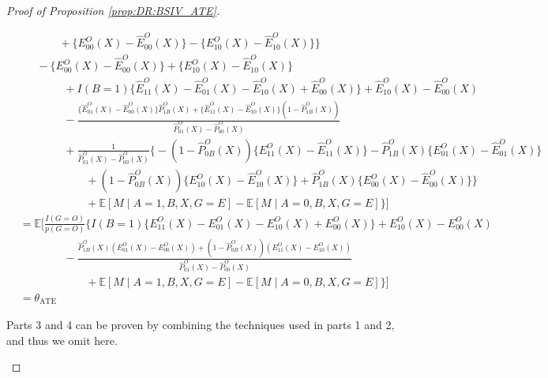 \documentclass[10pt]{article}
\newcommand{\E}{\mathbb{E}}
\begin{document}
\begin{proof}[Proof of Proposition \ref{prop:DR:BSIV_ATE}]
\begin{itemize}
{\begin{align*}
    &\ \ \ \ \ \ \ \ \ \ \ \ \ \ \ \ +\{E_{00}^O(X)-\hat{E}_{00}^O(X)\}-\{E_{10}^O(X)-\hat{E}_{10}^O(X)\}\Big\}\\
    &\ \ \ \ \ \ \ -\{E_{00}^O(X)-\hat{E}_{00}^O(X)\}+\{E_{10}^O(X)-\hat{E}_{10}^O(X)\}\\
    &\ \ \ \ \ \ \ \ \ \ \ \ \ \ \ \ \ \ +I(B=1)\{\hat{E}_{11}^O(X)-\hat{E}_{01}^O(X)-\hat{E}_{10}^O(X)+\hat{E}_{00}^O(X)\}+\hat{E}_{10}^O(X)-\hat{E}_{00}^O(X)\\
    &\ \ \ \ \ \ \ \ \ \ \ \ \ \ \ \ \ \ -\frac{\{\hat{E}_{01}^O(X)-\hat{E}_{00}^O(X)\}\hat{P}_{1B}^O(X)+\{\hat{E}_{11}^O(X)-\hat{E}_{10}^O(X)\}(1-\hat{P}_{1B}^O(X))}{\hat{P}_{01}^O(X)-\hat{P}_{00}^O(X)}\\
    &\ \ \ \ \ \ \ \ \ \ \ \ \ \ \ \ \ \ +\frac{1}{\hat{P}_{01}^O(X)-\hat{P}_{00}^O(X)}\bigg\{-(1-\hat{P}_{0B}^O(X))\{E_{11}^O(X)-\hat{E}_{11}^O(X)\}-\hat{P}_{1B}^O(X)\{E_{01}^O(X)-\hat{E}_{01}^O(X)\}\\
    &~~~~~~~~~~~~~~~~~~~~~~~~~~~+(1-\hat{P}_{0B}^O(X))\{E_{10}^O(X)-\hat{E}_{10}^O(X)\}+\hat{P}_{1B}^O(X)\{E_{00}^O(X)-\hat{E}_{00}^O(X)\}\bigg\}\\
    &~~~~~~~~~~~~~~~~~~~~~~~~~~~+\E[M\mid A=1,B,X,G=E]-\E[M\mid A=0,B,X,G=E]\Bigg\}\Big]\\
    &=\E\Big[\frac{I(G=O)}{p(G=O)}\Bigg\{I(B=1)\{E_{11}^O(X)-E_{01}^O(X)-E_{10}^O(X)+E_{00}^O(X)\}+E_{10}^O(X)-E_{00}^O(X)\\
    &\ \ \ \ \ \ \ \ \ \ \ \ \ \ \ \ \ \ -\frac{\hat{P}_{1B}^O(X)(E_{01}^O(X)-E_{00}^O(X))+(1-\hat{P}_{0B}^O(X))(E_{11}^O(X)-E_{10}^O(X))}{\hat{P}_{01}^O(X)-\hat{P}_{00}^O(X)}\\
    &~~~~~~~~~~~~~~~~~~~~~~~~~~~+\E[M\mid A=1,B,X,G=E]-\E[M\mid A=0,B,X,G=E]\Bigg\}\Big]\\
&=\theta_{\text{ATE}}
\end{align*}}
\endgroup

Parts 3 and 4 can be proven by combining the techniques used in parts 1 and 2, and thus we omit here.
    \end{itemize}
    \end{proof}
\end{document}
